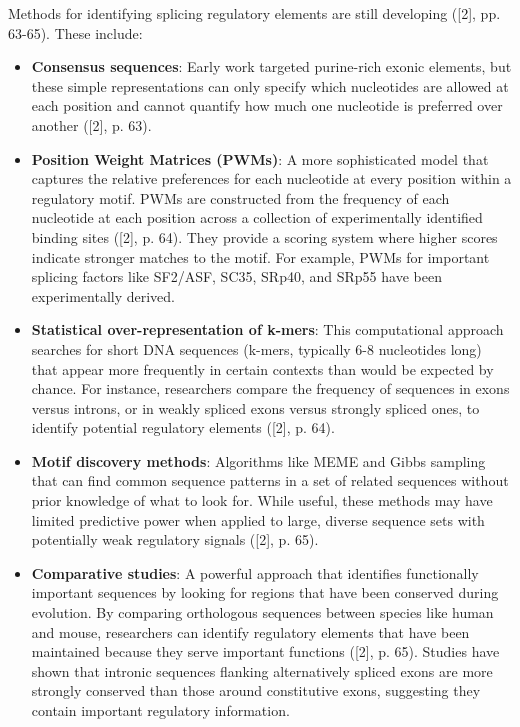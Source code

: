 \documentclass[12pt,a4paper]{article}
\begin{document}
Methods for identifying splicing regulatory elements are still developing ([2], pp. 63-65). These include:
\begin{itemize}
    \item \textbf{Consensus sequences}: Early work targeted purine-rich exonic elements, but these simple representations can only specify which nucleotides are allowed at each position and cannot quantify how much one nucleotide is preferred over another ([2], p. 63).
    \item \textbf{Position Weight Matrices (PWMs)}: A more sophisticated model that captures the relative preferences for each nucleotide at every position within a regulatory motif. PWMs are constructed from the frequency of each nucleotide at each position across a collection of experimentally identified binding sites ([2], p. 64). They provide a scoring system where higher scores indicate stronger matches to the motif. For example, PWMs for important splicing factors like SF2/ASF, SC35, SRp40, and SRp55 have been experimentally derived.
    \item \textbf{Statistical over-representation of k-mers}: This computational approach searches for short DNA sequences (k-mers, typically 6-8 nucleotides long) that appear more frequently in certain contexts than would be expected by chance. For instance, researchers compare the frequency of sequences in exons versus introns, or in weakly spliced exons versus strongly spliced ones, to identify potential regulatory elements ([2], p. 64).
    \item \textbf{Motif discovery methods}: Algorithms like MEME and Gibbs sampling that can find common sequence patterns in a set of related sequences without prior knowledge of what to look for. While useful, these methods may have limited predictive power when applied to large, diverse sequence sets with potentially weak regulatory signals ([2], p. 65).
    \item \textbf{Comparative studies}: A powerful approach that identifies functionally important sequences by looking for regions that have been conserved during evolution. By comparing orthologous sequences between species like human and mouse, researchers can identify regulatory elements that have been maintained because they serve important functions ([2], p. 65). Studies have shown that intronic sequences flanking alternatively spliced exons are more strongly conserved than those around constitutive exons, suggesting they contain important regulatory information.
\end{itemize}
\end{document}
